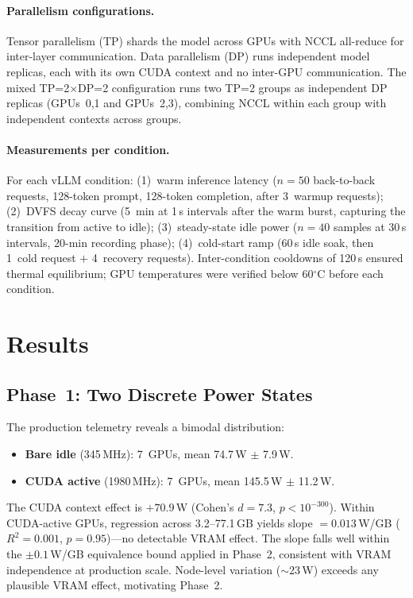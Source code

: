 \documentclass[sigconf,nonacm]{acmart}
\begin{document}
\paragraph{Parallelism configurations.} Tensor parallelism (TP) shards the model across GPUs with NCCL all-reduce for inter-layer communication. Data parallelism (DP) runs independent model replicas, each with its own CUDA context and no inter-GPU communication. The mixed TP=2$\times$DP=2 configuration runs two TP=2 groups as independent DP replicas (GPUs~0,1 and GPUs~2,3), combining NCCL within each group with independent contexts across groups.

\paragraph{Measurements per condition.} For each vLLM condition: (1)~warm inference latency ($n=50$ back-to-back requests, 128-token prompt, 128-token completion, after 3~warmup requests); (2)~DVFS decay curve (5~min at 1\,s intervals after the warm burst, capturing the transition from active to idle); (3)~steady-state idle power ($n=40$ samples at 30\,s intervals, 20-min recording phase); (4)~cold-start ramp (60\,s idle soak, then 1~cold request $+$ 4~recovery requests). Inter-condition cooldowns of 120\,s ensured thermal equilibrium; GPU temperatures were verified below 60$^\circ$C before each condition.

\section{Results}

\subsection{Phase~1: Two Discrete Power States}

The production telemetry reveals a bimodal distribution:
\begin{itemize}
    \item \textbf{Bare idle} (345\,MHz): 7~GPUs, mean 74.7\,W $\pm$ 7.9\,W.
    \item \textbf{CUDA active} (1980\,MHz): 7~GPUs, mean 145.5\,W $\pm$ 11.2\,W.
\end{itemize}
The CUDA context effect is $+70.9$\,W (Cohen's $d = 7.3$, $p < 10^{-300}$). Within CUDA-active GPUs, regression across 3.2--77.1\,GB yields slope $= 0.013$\,W/GB ($R^2 = 0.001$, $p = 0.95$)---no detectable VRAM effect. The slope falls well within the $\pm 0.1$\,W/GB equivalence bound applied in Phase~2, consistent with VRAM independence at production scale. Node-level variation ($\sim$23\,W) exceeds any plausible VRAM effect, motivating Phase~2.
\end{document}
